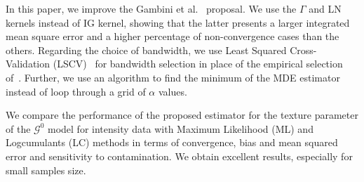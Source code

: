 \documentclass[twocolumn]{svjour3}
\begin{document}
	
	In this paper, we improve the Gambini et al.~\cite{gambini2015} proposal. We use the $\Gamma$ and LN kernels instead of IG kernel, showing that the latter presents a larger integrated mean square error and a higher percentage of non-convergence cases than the others.
	Regarding the choice of bandwidth, we use Least Squared Cross-Validation (LSCV)~\cite{Rudemo1982} for bandwidth selection in place of the empirical selection of~\cite{gambini2015}. 
	Further, we use an algorithm to find the minimum of the MDE estimator instead of loop through a grid of $\alpha$ values. 
	
	We compare the performance of the proposed estimator for the texture parameter of the $\mathcal{G}^0$ model for intensity data with Maximum Likelihood (ML) and Logcumulants (LC) methods in terms of convergence, bias and mean squared error and sensitivity to contamination. We obtain excellent results, especially for small samples size.
	
\end{document}
